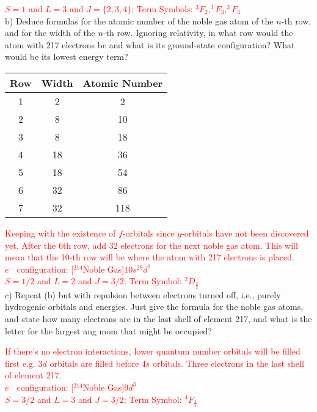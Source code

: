 \documentclass{article}
\begin{document}
\textcolor{red}{$S=1$ and $L=3$ and $J=\{2,3,4\}$;
  Term Symbols: $^3F_2, ^3F_3, ^3F_4$}
\\

\noindent b) Deduce formulas for the atomic number of the noble gas atom
of the $n$-th row, and for the width of the $n$-th row.  Ignoring
relativity, in what row would the atom with 217 electrons be and
what is its ground-state configuration?  What would be its lowest
energy term?

\begin{table}[hbpt]
  \center
  \begin{tabular}{ccc}
    Row & Width & Atomic Number \\
    \hline
    1 & 2 & 2 \\
    2 & 8 & 10 \\
    3 & 8 & 18 \\
    4 & 18& 36 \\
    5 & 18& 54 \\
    6 & 32& 86 \\
    7 & 32& 118
  \end{tabular}
\end{table}

\textcolor{red}{Keeping with the existence of $f$-orbitals since
  $g$-orbitals have not been discovered yet. After the 6th row,
  add 32 electrons for the next noble gas atom. This will mean that the
  10-th row will be where the atom with 217 electrons is placed.}
\\

\noindent\textcolor{red}{$e^-$ configuration: [$^{214}$Noble Gas]$10s^29d^1$
  \\
  $S=1/2$ and $L=2$ and $J=3/2$; Term Symbol: $^2D_{\frac{3}{2}}$}
\\

\noindent c) Repeat (b) but with repulsion between electrons turned off, i.e.,
purely hydrogenic orbitals and energies.  Just give the formula for the
noble gas atoms, and state how many electrons are in the last shell
of element 217, and what is the letter for the largest ang mom that
might be occupied?

\textcolor{red}{If there's no electron interactions, lower quantum
  number orbitals will be filled first e.g. $3d$ orbitals are filled before
  $4s$ orbitals. Three electrons in the last shell of element 217.}
\\

\noindent\textcolor{red}{$e^-$ configuration: [$^{214}$Noble Gas]$9d^3$
  \\
  $S=3/2$ and $L=3$ and $J=3/2$; Term Symbol: $^4F_{\frac{3}{2}}$}
\end{document}
